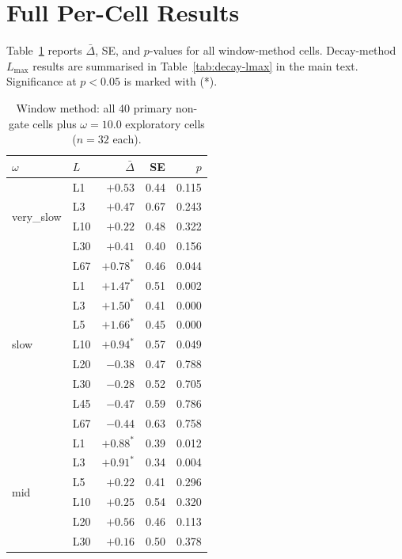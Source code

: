 \documentclass[sigconf,anonymous]{aamas}
\newcommand{\Dbar}{\bar{\Delta}}
\newcommand{\Lmax}{L_{\max}}
\begin{document}
\clearpage
\appendix

\section{Full Per-Cell Results}
\label{app:full-table}

Table~\ref{tab:full-window} reports $\Dbar$, SE, and $p$-values
for all window-method cells.  Decay-method $\Lmax$ results are
summarised in Table~\ref{tab:decay-lmax} in the main text.
Significance at $p{<}0.05$ is marked with (*).

\begin{table}[h]
\centering
\caption{Window method: all 40 primary non-gate cells plus
  $\omega{=}10.0$ exploratory cells ($n{=}32$ each).}
\label{tab:full-window}
\setlength\tabcolsep{3pt}
{\small
\begin{tabular}{llrrr}
\toprule
$\omega$ & $L$ & $\Dbar$ & SE & $p$ \\
\midrule
\multirow{4}{*}{very\_slow}
  & L1  & $+0.53$ & 0.44 & 0.115 \\
  & L3  & $+0.47$ & 0.67 & 0.243 \\
  & L10 & $+0.22$ & 0.48 & 0.322 \\
  & L30 & $+0.41$ & 0.40 & 0.156 \\
  & L67 & $+0.78^*$ & 0.46 & 0.044 \\
\midrule
\multirow{7}{*}{slow}
  & L1  & $+1.47^*$ & 0.51 & 0.002 \\
  & L3  & $+1.50^*$ & 0.41 & 0.000 \\
  & L5  & $+1.66^*$ & 0.45 & 0.000 \\
  & L10 & $+0.94^*$ & 0.57 & 0.049 \\
  & L20 & $-0.38$   & 0.47 & 0.788 \\
  & L30 & $-0.28$   & 0.52 & 0.705 \\
  & L45 & $-0.47$   & 0.59 & 0.786 \\
  & L67 & $-0.44$   & 0.63 & 0.758 \\
\midrule
\multirow{7}{*}{mid}
  & L1  & $+0.88^*$ & 0.39 & 0.012 \\
  & L3  & $+0.91^*$ & 0.34 & 0.004 \\
  & L5  & $+0.22$   & 0.41 & 0.296 \\
  & L10 & $+0.25$   & 0.54 & 0.320 \\
  & L20 & $+0.56$   & 0.46 & 0.113 \\
  & L30 & $+0.16$   & 0.50 & 0.378 \\

\end{tabular}}
\end{table}
\end{document}
